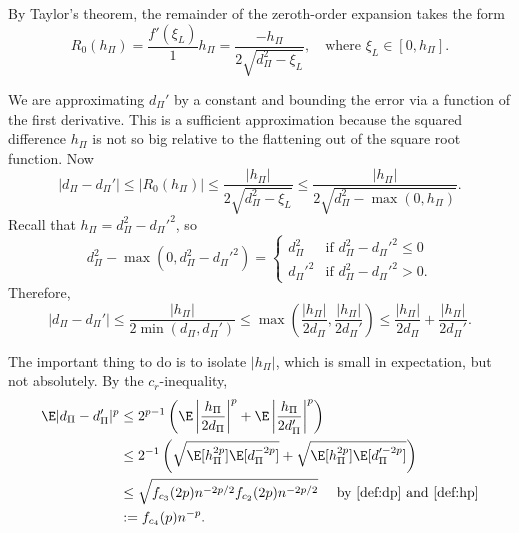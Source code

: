By Taylor's theorem, the remainder of the zeroth-order expansion takes the form
\begin{equation*}
  R_0(h_{\Pi}) = \frac{f'(\xi_L)}{1}h_{\Pi} = \frac{-h_{\Pi}}{2\sqrt{d_{\Pi}^2-\xi_L}}, \quad
  \text{where } \xi_L \in [0, h_{\Pi}].
\end{equation*}

We are approximating $d_{\Pi}'$ by a constant and bounding the error via a function of the first
derivative.  This is a sufficient approximation because the squared difference $h_{\Pi}$ is not so
big relative to the flattening out of the square root function.
Now
\begin{equation*}
  |d_{\Pi}-d_{\Pi}'| \leq |R_0(h_{\Pi})| \leq \frac{|h_{\Pi}|}{2\sqrt{d_{\Pi}^2-\xi_L}} \leq
  \frac{|h_{\Pi}|}{2\sqrt{d_{\Pi}^2-\max(0, h_{\Pi})}}.
\end{equation*}
Recall that $h_{\Pi} = d_{\Pi}^2 - d_{\Pi}'^2$, so
\begin{equation*}
  d_{\Pi}^2-\max(0, d_{\Pi}^2-d_{\Pi}'^2) =
  \begin{cases}
    d_{\Pi}^2 & \text{if } d_{\Pi}^2-d_{\Pi}'^2 \leq 0 \\
    d_{\Pi}'^2 & \text{if } d_{\Pi}^2-d_{\Pi}'^2 > 0.
  \end{cases}
\end{equation*}
Therefore,
\begin{equation*}
  |d_{\Pi}-d_{\Pi}'| \leq \frac{|h_{\Pi}|}{2\min(d_{\Pi}, d_{\Pi}')} \leq \max \left (
    \frac{|h_{\Pi}|}{2d_{\Pi}}, \frac{|h_{\Pi}|}{2d_{\Pi}'} \right ) \leq
  \frac{|h_{\Pi}|}{2d_{\Pi}} +  \frac{|h_{\Pi}|}{2d_{\Pi}'}.
\end{equation*}

The important thing to do is to isolate $|h_{\Pi}|$, which is small in
expectation, but not absolutely.  By the $c_r$-inequality,
\begin{align}
  \E |d_{\Pi}-d_{\Pi}'|^p
  &\leq 2^{p-1} \left ( \E \left | \frac{h_{\Pi}}{2d_{\Pi}} \right |^p + \E \left |
      \frac{h_{\Pi}}{2d_{\Pi}'} \right |^p \right ) \nonumber \\
  &\leq 2^{-1} \left ( \sqrt{\E[h_{\Pi}^{2p}]\E[d_{\Pi}^{-2p}]} +
  \sqrt{\E[h_{\Pi}^{2p}]\E[d_{\Pi}'^{-2p}]} \right ) \nonumber \\
  &\leq \sqrt{f_{c_3}(2p)n^{-2p/2} f_{c_2}(2p) n^{-2p/2}} \quad \text{ by } \eqref{def:dp}
  \text{ and } \eqref{def:hp} \nonumber \\
  &:= f_{c_4}(p) n^{-p} \label{def:ddiffp}.
\end{align}

